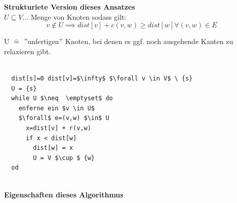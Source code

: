 \documentclass{article}
\begin{document}
 \textbf{Strukturiete Version dieses Ansatzes}\\
$U \subseteq  V \dots$ Menge von Knoten sodass gilt:\\
\[ v \notin U \implies dist[v] + c(v,w) \geq dist[w] \forall (v,w) \in E \]
 
U \(\widehat{=}\) $"$unfertigen$"$ Knoten, bei denen es ggf. noch ausgehende Kanten zu relaxieren gibt.


\begin{verbatim}
 
  dist[s]=0 dist[v]=$\infty$ $\forall v \in V$ \ {s}
  U = {s}
  while U $\neq  \emptyset$ do
    enferne ein $v \in U$
    $\forall$ e=(v,w) $\in$ U 
      x=dist[v] + r(v,w)
      if x < dist[w]
        dist[w] = x
        U = V $\cup $ {w}
  od
   
\end{verbatim}

\textbf{Eigenschaften dieses Algorithmus}\\
\end{document}
